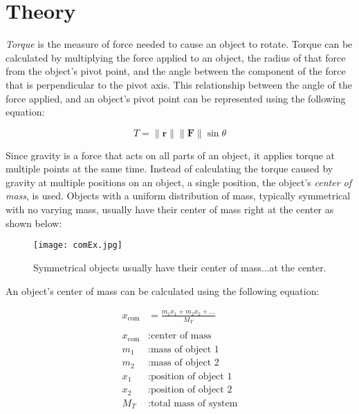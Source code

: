 \section{Theory}
\vspace{-0.5cm}
\singlespacing

\textit{Torque} is the measure of force needed to cause an object to rotate. Torque can be calculated by multiplying the force applied to an object, the radius of that force from the object's pivot point, and the angle between the component of the force that is perpendicular to the pivot axis. This relationship between the angle of the force applied, and an object's pivot point can be represented using the following equation:

\begin{equation}
    T = \| \mathbf{r} \| \| \mathbf{F} \| \sin \theta
		\label{eq:torque}
\end{equation}

Since gravity is a force that acts on all parts of an object, it applies torque at multiple points at the same time. Instead of calculating the torque caused by gravity at multiple positions on an object, a single position, the object's \textit{center of mass}, is used. Objects with a uniform distribution of mass, typically symmetrical with no varying mass, usually have their center of mass right at the center as shown below:

\begin{figure}[H]
	\begin{center}
		\texttt{[image: comEx.jpg]}
	\end{center}
	\caption{Symmetrical objects usually have their center of mass...at the center.}\label{fig:comEx}
\end{figure}

An object's center of mass can be calculated using the following equation:

\begin{align*}
	x_\text{com} &= \frac{m_1x_1 + m_2x_2 + ...}{M_T} \\ \\
x_\text{com} &: \text{center of mass} \\
	m_1 &: \text{mass of object 1} \\
	m_2 &: \text{mass of object 2} \\
	x_1 &: \text{position of object 1} \\
	x_2 &: \text{position of object 2} \\
	M_T &: \text{total mass of system}
\end{align*}

\newpage
